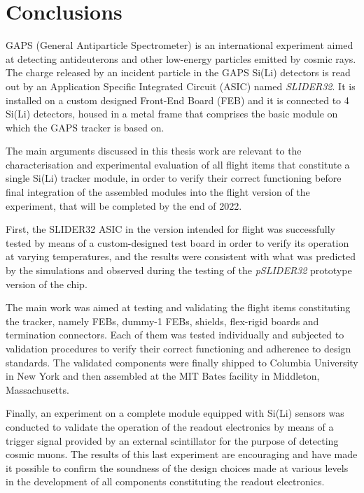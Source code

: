 \chapter*{Conclusions}

\par
GAPS (General Antiparticle Spectrometer) is an international experiment aimed at detecting antideuterons and other low-energy particles emitted by cosmic rays. The charge released by an incident particle in the GAPS Si(Li) detectors is read out by an Application Specific Integrated Circuit (ASIC) named \textit{SLIDER32}. It is installed on a custom designed Front-End Board (FEB) and it is connected to 4 Si(Li) detectors, housed in a metal frame that comprises the basic module on which the GAPS tracker is based on.

\par
The main arguments discussed in this thesis work are relevant to the characterisation and experimental evaluation of all flight items that constitute a single Si(Li) tracker module, in order to verify their correct functioning before final integration of the assembled modules into the flight version of the experiment, that will be completed by the end of 2022.

\par
First, the SLIDER32 ASIC in the version intended for flight was successfully tested by means of a custom-designed test board in order to verify its operation at varying temperatures, and the results were consistent with what was predicted by the simulations and observed during the testing of the \textit{pSLIDER32} prototype version of the chip.

\par
The main work was aimed at testing and validating the flight items constituting the tracker, namely FEBs, dummy-1 FEBs, shields, flex-rigid boards and termination connectors. Each of them was tested individually and subjected to validation procedures to verify their correct functioning and adherence to design standards. The validated components were finally shipped to Columbia University in New York and then assembled at the MIT Bates facility in Middleton, Massachusetts.

\par
Finally, an experiment on a complete module equipped with Si(Li) sensors was conducted to validate the operation of the readout electronics by means of a trigger signal provided by an external scintillator for the purpose of detecting cosmic muons. The results of this last experiment are encouraging and have made it possible to confirm the soundness of the design choices made at various levels in the development of all components constituting the readout electronics.

